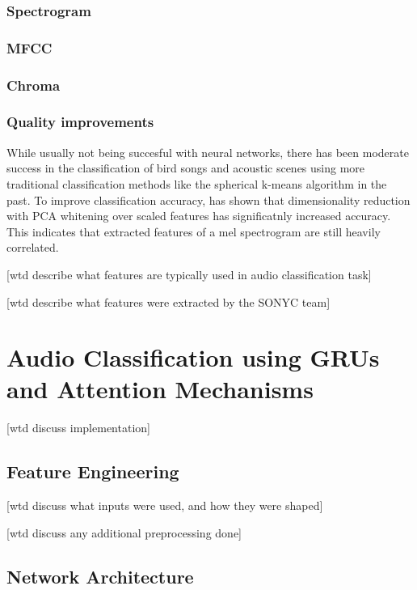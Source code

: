 \subsection{Spectrogram}

\subsection{MFCC}

\subsection{Chroma}

\subsection{Quality improvements}
While usually not being succesful with neural networks, there has been moderate success in the classification of bird songs and acoustic scenes using more traditional classification methods like the spherical k-means algorithm in the past. To improve classification accuracy, \cite{Coates2012} has shown that dimensionality reduction with PCA whitening over scaled features has significatnly increased accuracy. 
This indicates that extracted features of a mel spectrogram are still heavily correlated.


[wtd describe what features are typically used in audio classification task]

[wtd describe what features were extracted by the SONYC team]

\chapter{Audio Classification using GRUs and Attention Mechanisms}

[wtd discuss implementation]

\section{Feature Engineering}

[wtd discuss what inputs were used, and how they were shaped]

[wtd discuss any additional preprocessing done]

\section{Network Architecture}

